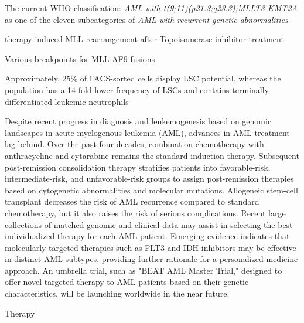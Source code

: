 The current WHO classification: \emph{AML with t(9;11)(p21.3;q23.3);MLLT3-KMT2A} as one of the eleven subcategories of \emph{AML with recurrent genetic abnormalities}\cite{Arber2016}



therapy induced MLL rearrangement after Topoisomerase inhibitor treatment\cite{Super1993}

Various breakpoints for MLL-AF9 fusions\cite{Super1997}

Approximately, 25\% of FACS-sorted \kithi cells display LSC potential, whereas the \kitlow population has a 14-fold lower frequency of LSCs and contains terminally differentiated leukemic neutrophils\cite{Somervaille2009}





Despite recent progress in diagnosis and leukemogenesis based on genomic landscapes in acute myelogenous leukemia (AML), advances in AML treatment lag behind. Over the past four decades, combination chemotherapy with anthracycline and cytarabine remains the standard induction therapy. Subsequent post-remission consolidation therapy stratifies patients into favorable-risk, intermediate-risk, and unfavorable-risk groups to assign post-remission therapies based on cytogenetic abnormalities and molecular mutations. Allogeneic stem-cell transplant decreases the risk of AML recurrence compared to standard chemotherapy, but it also raises the risk of serious complications. Recent large collections of matched genomic and clinical data may assist in selecting the best individualized therapy for each AML patient. Emerging evidence indicates that molecularly targeted therapies such as FLT3 and IDH inhibitors may be effective in distinct AML subtypes, providing further rationale for a personalized medicine approach. An umbrella trial, such as "BEAT AML Master Trial," designed to offer novel targeted therapy to AML patients based on their genetic characteristics, will be launching worldwide in the near future.




Therapy \cite{Cruickshank2017}
